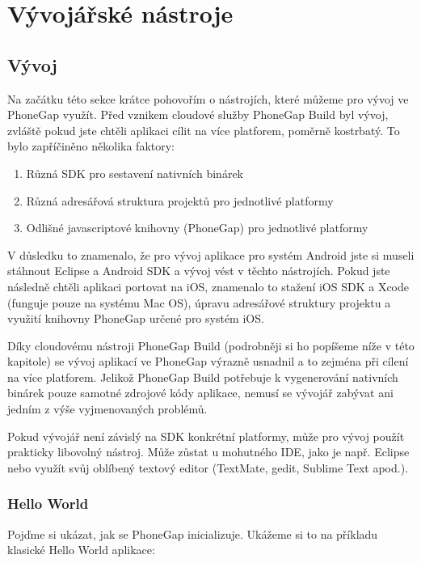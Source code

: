 \section{Vývojářské nástroje}
\subsection{Vývoj}
Na začátku této sekce krátce pohovořím o nástrojích, které můžeme pro vývoj ve PhoneGap využít. Před vznikem cloudové služby PhoneGap Build byl vývoj, zvláště pokud jste chtěli aplikaci cílit na více platforem, poměrně kostrbatý. To bylo zapříčiněno několika faktory:

\begin{enumerate}
	\item Různá SDK pro sestavení nativních binárek
	\item Různá adresářová struktura projektů pro jednotlivé platformy
	\item Odlišné javascriptové knihovny (PhoneGap) pro jednotlivé platformy
\end{enumerate}

V důsledku to znamenalo, že pro vývoj aplikace pro systém Android jste si museli stáhnout Eclipse a Android SDK a vývoj vést v těchto nástrojích. Pokud jste následně chtěli aplikaci portovat na iOS, znamenalo to stažení iOS SDK a Xcode (funguje pouze na systému Mac OS), úpravu adresářové struktury projektu a využití knihovny PhoneGap určené pro systém iOS.

Díky cloudovému nástroji PhoneGap Build (podrobněji si ho popíšeme níže v této kapitole) se vývoj aplikací ve PhoneGap výrazně usnadnil a to zejména při cílení na více platforem. Jelikož PhoneGap Build potřebuje k vygenerování nativních binárek pouze samotné zdrojové kódy aplikace, nemusí se vývojář zabývat ani jedním z výše vyjmenovaných problémů.

Pokud vývojář není závislý na SDK konkrétní platformy, může pro vývoj použít prakticky libovolný nástroj. Může zůstat u mohutného IDE, jako je např. Eclipse nebo využít svůj oblíbený textový editor (TextMate, gedit, Sublime Text apod.).

\subsubsection{Hello World}
Pojďme si ukázat, jak se PhoneGap inicializuje. Ukážeme si to na příkladu klasické Hello World aplikace:

